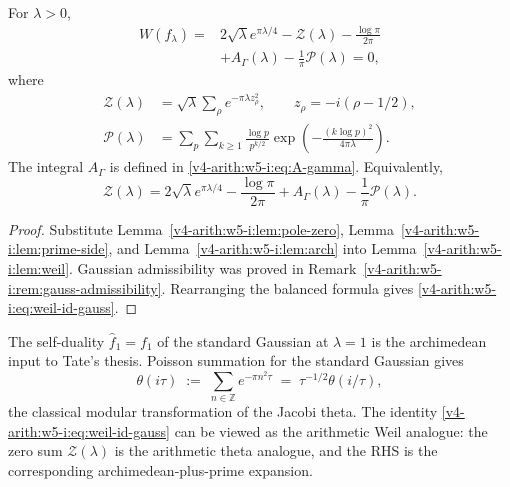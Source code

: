 \begin{theorem}
\label{v4-arith:w5-i:thm:weil-gauss-closed}

For $\lambda>0$,
\begin{equation}
\begin{split}
 W(f_\lambda)={}&2\sqrt\lambda e^{\pi\lambda/4}-\mathcal Z(\lambda)
 -\frac{\log\pi}{2\pi}\\
 &+A_\Gamma(\lambda)-\frac1\pi\mathcal P(\lambda)=0,
\end{split}
\label{v4-arith:w5-i:eq:weil-gauss-closed}
\end{equation}
where
\begin{align}
 \mathcal Z(\lambda)
 &=\sqrt\lambda\sum_\rho e^{-\pi\lambda z_\rho^2},\qquad
 z_\rho=-i(\rho-1/2),\label{v4-arith:w5-i:eq:Z-lambda}\\
 \mathcal P(\lambda)
 &=\sum_p\sum_{k\geq1}\frac{\log p}{p^{k/2}}
       \exp\left(-\frac{(k\log p)^2}{4\pi\lambda}\right).
 \label{v4-arith:w5-i:eq:P-lambda}
\end{align}
The integral $A_\Gamma$ is defined in \eqref{v4-arith:w5-i:eq:A-gamma}.
Equivalently,
\begin{equation}
 \mathcal Z(\lambda)=2\sqrt\lambda e^{\pi\lambda/4}
 -\frac{\log\pi}{2\pi}+A_\Gamma(\lambda)-\frac1\pi\mathcal P(\lambda).
 \label{v4-arith:w5-i:eq:weil-id-gauss}
\end{equation}
\end{theorem}
\begin{proof}
Substitute Lemma~\ref{v4-arith:w5-i:lem:pole-zero},
Lemma~\ref{v4-arith:w5-i:lem:prime-side}, and
Lemma~\ref{v4-arith:w5-i:lem:arch} into
Lemma~\ref{v4-arith:w5-i:lem:weil}.
Gaussian admissibility was proved in
Remark~\ref{v4-arith:w5-i:rem:gauss-admissibility}.
Rearranging the balanced formula gives
\eqref{v4-arith:w5-i:eq:weil-id-gauss}.
\end{proof}

\begin{remark}
\label{v4-arith:w5-i:rem:poisson}
The self-duality \(\widehat{f}_{1}=f_{1}\) of the standard Gaussian
at \(\lambda=1\) is the archimedean input to Tate's thesis. Poisson
summation for the standard Gaussian gives
\[
\theta(i\tau)\;:=\;\sum_{n\in\mathbb{Z}}e^{-\pi n^{2}\tau}\;=\;\tau^{-1/2}\theta(i/\tau),
\]
the classical modular transformation of the Jacobi theta. The
identity \eqref{v4-arith:w5-i:eq:weil-id-gauss} can be viewed as the
arithmetic Weil analogue: the zero sum \(\mathcal{Z}(\lambda)\) is the
arithmetic theta analogue, and the RHS is the corresponding
archimedean-plus-prime expansion.
\end{remark}


